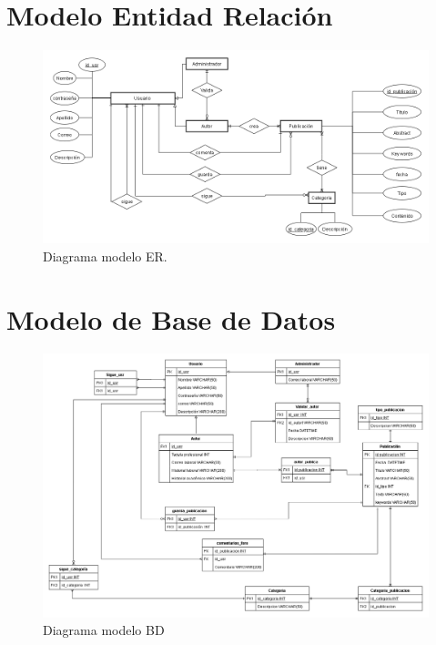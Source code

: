 \documentclass[a4paper,12 pt]{article}
\begin{document}
\begin{landscape}
\section{Modelo Entidad Relación}
    \begin{figure}[H]
        \centering
        \includegraphics[scale = 0.7]{images/ERD_v02.png}
        \caption{Diagrama modelo ER.}
        \label{F13}
    \end{figure}{}

\section{Modelo de Base de Datos}
    \begin{figure}[H]
        \centering
        \includegraphics[scale = 0.45]{images/BD_v02.png}
        \caption{Diagrama modelo BD}
        \label{F11}
    \end{figure}{}
\end{landscape}
\end{document}

